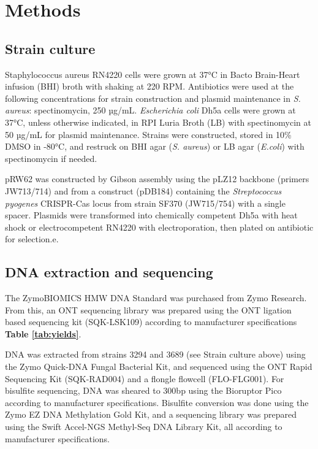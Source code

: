 \section{Methods}
\label{sec:methods}

\subsection{Strain culture}
\label{sec:methods}

Staphylococcus aureus RN4220 cells were grown at 37°C in Bacto Brain-Heart infusion (BHI) broth with shaking at 220 RPM. Antibiotics were used at the following concentrations for strain construction and plasmid maintenance in \textit{S. aureus}: spectinomycin, 250 µg/mL. \textit{Escherichia coli} Dh5a cells were grown at 37°C, unless otherwise indicated, in RPI Luria Broth (LB) with spectinomycin at 50 µg/mL for plasmid maintenance. Strains were constructed, stored in 10\% DMSO in -80°C, and restruck on BHI agar (\textit{S. aureus}) or LB agar (\textit{E.coli}) with spectinomycin if needed.

pRW62 was constructed by Gibson assembly using the pLZ12 backbone (primers JW713/714) and from a construct (pDB184) containing the \textit{Streptococcus pyogenes} CRISPR-Cas locus from strain SF370 (JW715/754) with a single spacer. Plasmids were transformed into chemically competent Dh5a with heat shock or electrocompetent RN4220 with electroporation, then plated on antibiotic for selection.e.

\subsection{DNA extraction and sequencing}
\label{sec:methods}

The ZymoBIOMICS HMW DNA Standard was purchased from Zymo Research. From this, an ONT sequencing library was prepared using the ONT ligation based sequencing kit (SQK-LSK109) according to manufacturer specifications {\bf Table \ref{tab:yields}}.

DNA was extracted from strains 3294 and 3689 (see Strain culture above) using the Zymo Quick-DNA Fungal Bacterial Kit, and sequenced using the ONT Rapid Sequencing Kit (SQK-RAD004) and a flongle flowcell (FLO-FLG001). For bisulfite sequencing, DNA was sheared to 300bp using the Bioruptor Pico according to manufacturer specifications. Bisulfite conversion was done using the Zymo EZ DNA Methylation Gold Kit, and a sequencing library was prepared using the Swift Accel-NGS Methyl-Seq DNA Library Kit, all according to manufacturer specifications.

